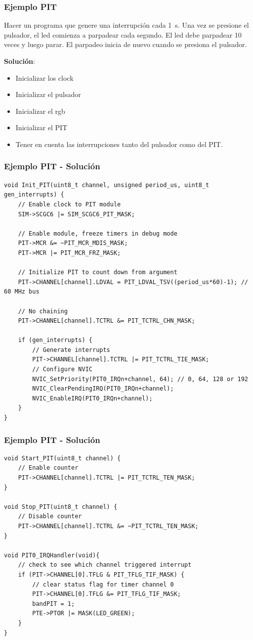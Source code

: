 \documentclass[10.5pt,scale=1.0,t,aspectratio=169,hyperref={pdfpagelabels=false}]{beamer}
\begin{document}
\begin{frame}
	\frametitle{Ejemplo PIT}
	{\small
		Hacer un programa que genere una interrupción cada \SI{1}{\second}. Una vez se presione el pulsador, el led comienza a parpadear cada segundo. El led debe parpadear 10 veces y luego parar. El parpadeo inicia de nuevo cuando se presiona el pulsador. 
		
		\textbf{Solución}:
		
		\begin{itemize}
			\item Inicializar los clock
			\item Inicializar el pulsador
			\item Inicializar el rgb
			\item Inicializar el PIT
			\item Tener en cuenta las interrupciones tanto del pulsador como del PIT.
		\end{itemize}
	}
\end{frame}
\begin{frame}[fragile]
	\frametitle{Ejemplo PIT - Solución}
	{\small
\begin{lstlisting}[style=CStyle]
void Init_PIT(uint8_t channel, unsigned period_us, uint8_t gen_interrupts) {
	// Enable clock to PIT module
	SIM->SCGC6 |= SIM_SCGC6_PIT_MASK;
	
	// Enable module, freeze timers in debug mode
	PIT->MCR &= ~PIT_MCR_MDIS_MASK;
	PIT->MCR |= PIT_MCR_FRZ_MASK;
	
	// Initialize PIT to count down from argument
	PIT->CHANNEL[channel].LDVAL = PIT_LDVAL_TSV((period_us*60)-1); // 60 MHz bus 
	
	// No chaining
	PIT->CHANNEL[channel].TCTRL &= PIT_TCTRL_CHN_MASK;
	
	if (gen_interrupts) {
		// Generate interrupts
		PIT->CHANNEL[channel].TCTRL |= PIT_TCTRL_TIE_MASK;
		// Configure NVIC
		NVIC_SetPriority(PIT0_IRQn+channel, 64); // 0, 64, 128 or 192
		NVIC_ClearPendingIRQ(PIT0_IRQn+channel);
		NVIC_EnableIRQ(PIT0_IRQn+channel);
	}
}
\end{lstlisting}		
	}
\end{frame}
\begin{frame}[fragile]
	\frametitle{Ejemplo PIT - Solución}
	{\small
		\begin{lstlisting}[style=CStyle]
void Start_PIT(uint8_t channel) {
	// Enable counter
	PIT->CHANNEL[channel].TCTRL |= PIT_TCTRL_TEN_MASK;
}

void Stop_PIT(uint8_t channel) {
	// Disable counter
	PIT->CHANNEL[channel].TCTRL &= ~PIT_TCTRL_TEN_MASK;
}

void PIT0_IRQHandler(void){
	// check to see which channel triggered interrupt
	if (PIT->CHANNEL[0].TFLG & PIT_TFLG_TIF_MASK) {
		// clear status flag for timer channel 0
		PIT->CHANNEL[0].TFLG &= PIT_TFLG_TIF_MASK;
		bandPIT = 1;
		PTE->PTOR |= MASK(LED_GREEN);
	}
}
		\end{lstlisting}		
	}
\end{frame}
\end{document}

